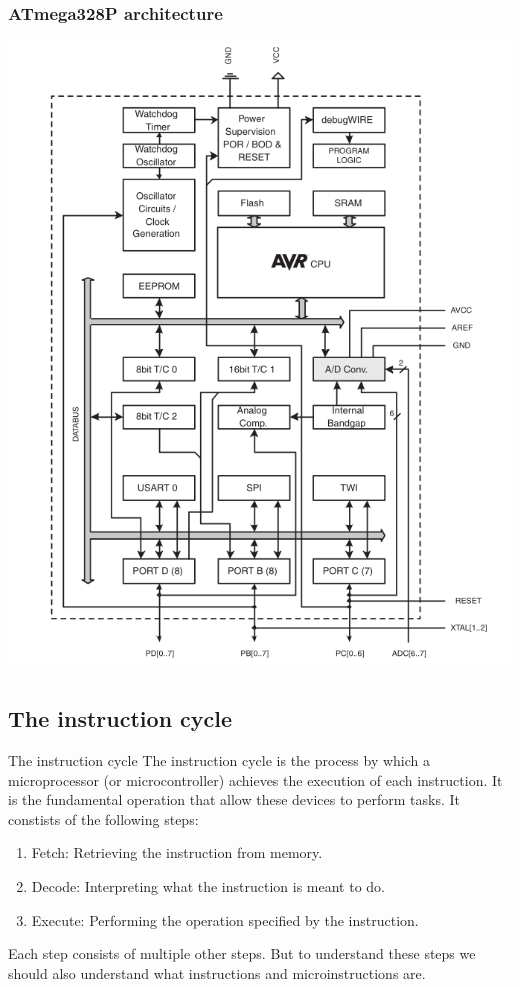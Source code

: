 \documentclass[aspectratio=169]{beamer}
\begin{document}
\begin{frame}
  \frametitle{ATmega328P architecture}
  \centering
  \includegraphics[height=0.9\textheight]{assets/328p_uarch.png}
\end{frame}

\subsection{The instruction cycle}
\begin{frame}{The instruction cycle}
  The instruction cycle is the process by which a microprocessor (or microcontroller) achieves the execution of each instruction. It is the fundamental operation that allow these devices to perform tasks. It constists of the following steps:
  \begin{enumerate}
        \item <2-> Fetch: Retrieving the instruction from memory.
        \item <3-> Decode: Interpreting what the instruction is meant to do.
        \item <4-> Execute: Performing the operation specified by the instruction.
  \end{enumerate}
  Each step consists of multiple other steps. But to understand these steps we should also understand what instructions and microinstructions are.
\end{frame}
\end{document}
